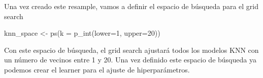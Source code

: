 \documentclass[
  11pt,
  a4paper,
]{article}
\newenvironment{Shaded}{\begin{snugshade}}{\end{snugshade}}
\newcommand{\AttributeTok}[1]{\textcolor[rgb]{0.77,0.63,0.00}{#1}}
\newcommand{\CommentTok}[1]{\textcolor[rgb]{0.56,0.35,0.01}{\textit{#1}}}
\newcommand{\ConstantTok}[1]{\textcolor[rgb]{0.00,0.00,0.00}{#1}}
\newcommand{\DecValTok}[1]{\textcolor[rgb]{0.00,0.00,0.81}{#1}}
\newcommand{\FunctionTok}[1]{\textcolor[rgb]{0.00,0.00,0.00}{#1}}
\newcommand{\NormalTok}[1]{#1}
\newcommand{\OtherTok}[1]{\textcolor[rgb]{0.56,0.35,0.01}{#1}}
\newcommand{\SpecialCharTok}[1]{\textcolor[rgb]{0.00,0.00,0.00}{#1}}
\newcommand{\StringTok}[1]{\textcolor[rgb]{0.31,0.60,0.02}{#1}}
\begin{document}
Una vez creado este resample, vamos a definir el espacio de búsqueda
para el grid search

\begin{Shaded}
\begin{Highlighting}[]
\NormalTok{knn\_space }\OtherTok{\textless{}{-}} \FunctionTok{ps}\NormalTok{(}\AttributeTok{k =} \FunctionTok{p\_int}\NormalTok{(}\AttributeTok{lower=}\DecValTok{1}\NormalTok{, }\AttributeTok{upper=}\DecValTok{20}\NormalTok{))}
\end{Highlighting}
\end{Shaded}

Con este espacio de búsqueda, el grid search ajustará todos los modelos
KNN con un número de vecinos entre 1 y 20. Una vez definido este espacio
de búsqueda ya podemos crear el learner para el ajuste de
hiperparámetros.

\begin{Shaded}
\end{Shaded}
\end{document}
